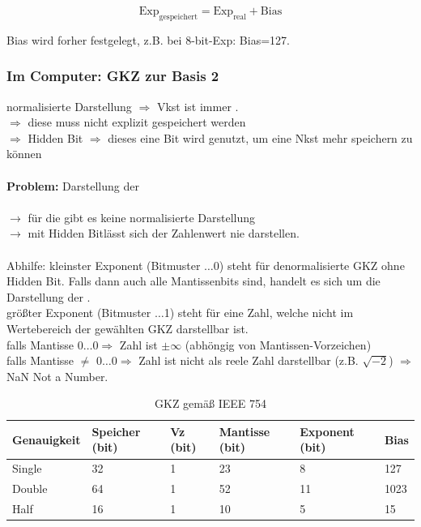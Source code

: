 \documentclass[10pt,a4paper]{scrartcl}
\begin{document}
$$
\text{Exp}_{\text{gespeichert}} = \text{Exp}_{\text{real}} + \text{Bias}
$$

Bias wird forher festgelegt, z.B. bei 8-bit-Exp: Bias=127.

\subsubsection*{Im Computer: \ac{GKZ} zur Basis 2}
normalisierte Darstellung $ \Rightarrow $ Vkst ist immer \grqq.\\
$ \Rightarrow $ diese \grqq muss nicht explizit gespeichert werden\\
$ \Rightarrow $ \glqq Hidden Bit\grqq
$ \Rightarrow $ dieses eine Bit wird genutzt, um eine Nkst mehr speichern zu können\\
\\
\indent \textbf{Problem:} Darstellung der \grqq 
\\\\
$ \rightarrow $ für die \grqq gibt es keine normalisierte Darstellung\\
$ \rightarrow $ mit \glqq Hidden Bit\grqq lässt sich der Zahlenwert \grqq nie darstellen.
\\\\
Abhilfe: kleinster Exponent (Bitmuster $\ldots$0) steht für denormalisierte \ac{GKZ} ohne Hidden Bit. Falls dann auch alle Mantissenbits \grqq sind, handelt es sich um die Darstellung der \grqq.\\
größter Exponent (Bitmuster $\ldots$1\grqq) steht für eine Zahl, welche nicht im Wertebereich der gewählten \ac{GKZ} darstellbar ist.\\
\indent falls Mantisse \glqq $0 \ldots 0$\grqq $\Rightarrow$ Zahl ist $\pm \infty$ (abhöngig von Mantissen-Vorzeichen)\\
\indent falls Mantisse $\neq$ \glqq$0 \ldots 0$\grqq $\Rightarrow$ Zahl ist nicht als reele Zahl darstellbar (z.B. $ \sqrt{-2} $) $\Rightarrow$ NaN \glqq Not a Number\grqq.\\

\begin{table}[h]
	\centering
	\begin{tabular}{l|l|l|l|l|l}
		Genauigkeit & Speicher (bit) & Vz (bit) & Mantisse (bit) & Exponent (bit) & Bias \\ \hline
		Single & 32 & 1 & 23 & 8 & 127\\
		Double & 64 & 1 & 52 & 11 & 1023 \\
		Half & 16 & 1 & 10 & 5 & 15\\
	\end{tabular}
\caption{\acl{GKZ} gemäß IEEE 754}
\end{table}
\end{document}
